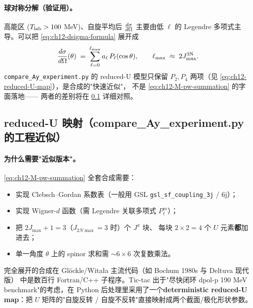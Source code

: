 \paragraph{球对称分解（验证用）。}
高能区 (\({T_{\text{lab}}} > 100\) MeV)、自旋平均后 \(\frac{d\sigma}{d\Omega}\) 主要由低 \(\ell\)
的 Legendre 多项式主导。可以把 \cref{eq:ch12-dsigma-formula} 展开成
\begin{equation}
\label{eq:ch12-dsigma-legendre}
\frac{d\sigma}{d\Omega}(\theta) \;=\; \sum_{\ell=0}^{\ell_{\max}} a_\ell\,P_\ell(\cos\theta), \qquad
\ell_{\max} \;\approx\; 2 J_{\max}^{\rm 3N}.
\end{equation}
\texttt{compare\_Ay\_experiment.py} 的 reduced-U 模型只保留 \(P_2, P_4\)
两项（见 \cref{eq:ch12-reduced-U-map}），是合成的"快速近似"，
不是 \cref{eq:ch12-M-pw-summation} 的字面落地——
两者的差别将在 \cref{subsec:ch12-reduced-U-vs-full} 详细对照。

\subsection{reduced-U 映射（compare\_Ay\_experiment.py 的工程近似）}
\label{subsec:ch12-reduced-U-vs-full}

\paragraph{为什么需要"近似版本"。}
\cref{eq:ch12-M-pw-summation} 全套合成需要：
\begin{itemize}
  \item 实现 Clebsch--Gordan 系数表（一般用 GSL \texttt{gsl\_sf\_coupling\_3j} / 6j）；
  \item 实现 Wigner-\(d\) 函数（需 Legendre 关联多项式 \(P_\ell^m\)）；
  \item 把 \(2 J_{\max} + 1 = 3\)（\(J_{2N\max} = 3\) 时）个 \(J^\pi\) 块、
        每块 \(2 \times 2 = 4\) 个 \(U\) 元素\textbf{都}加进去；
  \item 单一角度 \(\theta\) 上的 spinor 求和需 \(\sim 6 \times 6\) 次复数乘法。
\end{itemize}
完全展开的合成在 Glöckle/Witała 主流代码（如 Bochum 1980s 与 Deltuva 现代版）
中是数百行 Fortran/C++ 子程序。Tic-tac 出于"尽快闭环 dpol-p 190 MeV
benchmark"的考虑，在 Python 后处理里采用了一个\textbf{deterministic reduced-U
map}：把 \(U\) 矩阵的"自旋反转 / 自旋不反转"直接映射成两个截面/极化形状参数。

